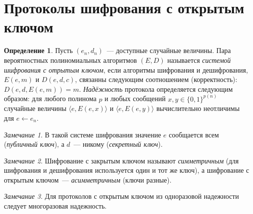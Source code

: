 \documentclass[12pt,a4paper]{article}
\newcommand{\bits}{\{0,1\}}
\theoremstyle{definition}
\newtheorem{definition}{Определение}[section]
\theoremstyle{plain}
\theoremstyle{remark}
\newtheorem{remark}{Замечание}[section]
\begin{document}
\section{Протоколы шифрования с открытым ключом}
\begin{definition}
Пусть $(e_n, d_n)$~--- доступные случайные величины. Пара вероятностных 
полиномиальных алгоритмов $(E,D)$ называется 
\emph{системой шифрования с отрытым ключом}, если 
алгоритмы шифрования и дешифрования, $E(e,m)$ и $D(e,d,c)$, связанны
следующим соотношением (корректность):
$D(e, d, E(e, m)) = m$.
\emph{Надёжность} протокола определяется следующим
образом: для любого полинома $p$
и любых сообщений
$x,y\in\bits^{p(n)}$ случайные величины $\langle e, E(e, x)\rangle$ и $\langle e,E(e, y)\rangle$
вычислительно неотличимы для $e\gets e_n$.
\end{definition}

\begin{remark}
В такой системе шифрования значение $e$ сообщается всем (\emph{публичный ключ}), 
а $d$~--- никому (\emph{секретный ключ}). 
\end{remark}

\begin{remark}
Шифрование с закрытым ключом называют \emph{симметричным} (для шифрования и дешифрования используется один и тот же ключ), а шифрование с открытым ключом~--- \emph{асимметричным} (ключи разные). 
\end{remark}

\begin{remark}
Для протоколов с открытым ключом из одноразовой надежности следует многоразовая надежность.
\end{remark}
\end{document}

